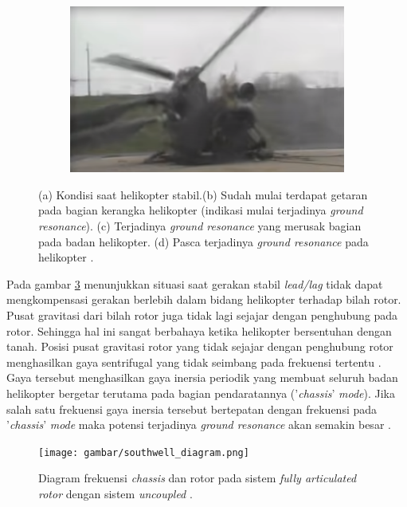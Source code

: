\begin{figure}[H]
\begin{subfigure}{0.4\textwidth}
		\caption{}
		\label{fig:gr_3}
	\end{subfigure}
	\centering
	\begin{subfigure}{0.4\textwidth}
		\centering
		\includegraphics[width=\linewidth]{gambar/gr_4.png}
		\caption{}
		\label{fig:gr_4}
	\end{subfigure}
		\caption{(a) Kondisi saat helikopter stabil.(b) Sudah mulai terdapat getaran pada bagian kerangka helikopter (indikasi mulai terjadinya \textit{ground resonance}). (c) Terjadinya \textit{ground resonance} yang merusak bagian pada badan helikopter. (d) Pasca terjadinya \textit{ground resonance} pada helikopter \cite{squorch_2006}.}	
		\label{fig:gr}
\end{figure}

Pada gambar \ref{fig:gr} menunjukkan situasi saat gerakan stabil \textit{lead/lag} tidak dapat mengkompensasi gerakan berlebih dalam bidang helikopter terhadap bilah rotor. Pusat gravitasi dari bilah rotor juga tidak lagi sejajar dengan penghubung pada rotor. Sehingga hal ini sangat berbahaya ketika helikopter bersentuhan dengan tanah. Posisi pusat gravitasi rotor yang tidak sejajar dengan penghubung rotor menghasilkan gaya sentrifugal yang tidak seimbang pada frekuensi tertentu \cite{Eckert2007AnalyticalAA}. Gaya tersebut menghasilkan gaya inersia periodik yang membuat seluruh badan helikopter bergetar terutama pada bagian pendaratannya ('\textit{chassis}' \textit{mode}). Jika salah satu frekuensi gaya inersia tersebut bertepatan dengan frekuensi pada '\textit{chassis}' \textit{mode} maka potensi terjadinya \textit{ground resonance} akan semakin besar \cite{bramwell2001bramwell}.

\begin{figure}[H]
	\centering
	\texttt{[image: gambar/southwell\_diagram.png]}
	\caption{Diagram frekuensi \textit{chassis} dan rotor pada sistem \textit{fully articulated rotor} dengan sistem \textit{uncoupled} \cite{bramwell2001bramwell}.}
	\label{fig:southwell_diagram}
\end{figure}

